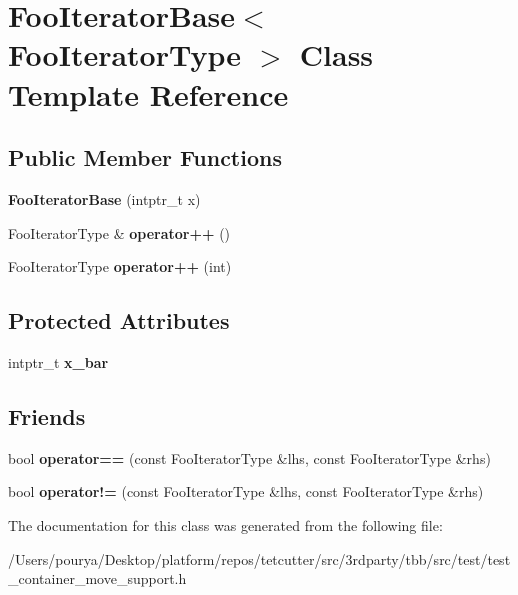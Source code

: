 \hypertarget{classFooIteratorBase}{}\section{Foo\+Iterator\+Base$<$ Foo\+Iterator\+Type $>$ Class Template Reference}
\label{classFooIteratorBase}
\subsection*{Public Member Functions}
\begin{DoxyCompactItemize}
\item 
\hypertarget{classFooIteratorBase_af65b3e448bd0bba2670e4d5f7b35109a}{}{\bfseries Foo\+Iterator\+Base} (intptr\+\_\+t x)\label{classFooIteratorBase_af65b3e448bd0bba2670e4d5f7b35109a}

\item 
\hypertarget{classFooIteratorBase_a5b726b3fe8291e200a3648c48f0954d1}{}Foo\+Iterator\+Type \& {\bfseries operator++} ()\label{classFooIteratorBase_a5b726b3fe8291e200a3648c48f0954d1}

\item 
\hypertarget{classFooIteratorBase_ad5b9fefb2105c547f68261f139feb93c}{}Foo\+Iterator\+Type {\bfseries operator++} (int)\label{classFooIteratorBase_ad5b9fefb2105c547f68261f139feb93c}

\end{DoxyCompactItemize}
\subsection*{Protected Attributes}
\begin{DoxyCompactItemize}
\item 
\hypertarget{classFooIteratorBase_a8df7a41b3a2f80df659cf661e66f635f}{}intptr\+\_\+t {\bfseries x\+\_\+bar}\label{classFooIteratorBase_a8df7a41b3a2f80df659cf661e66f635f}

\end{DoxyCompactItemize}
\subsection*{Friends}
\begin{DoxyCompactItemize}
\item 
\hypertarget{classFooIteratorBase_a55c91277f321d856f10c93136125f57d}{}bool {\bfseries operator==} (const Foo\+Iterator\+Type \&lhs, const Foo\+Iterator\+Type \&rhs)\label{classFooIteratorBase_a55c91277f321d856f10c93136125f57d}

\item 
\hypertarget{classFooIteratorBase_ae917c65b4225e3b8529bb80224f221d2}{}bool {\bfseries operator!=} (const Foo\+Iterator\+Type \&lhs, const Foo\+Iterator\+Type \&rhs)\label{classFooIteratorBase_ae917c65b4225e3b8529bb80224f221d2}

\end{DoxyCompactItemize}


The documentation for this class was generated from the following file\+:\begin{DoxyCompactItemize}
\item 
/\+Users/pourya/\+Desktop/platform/repos/tetcutter/src/3rdparty/tbb/src/test/test\+\_\+container\+\_\+move\+\_\+support.\+h\end{DoxyCompactItemize}
